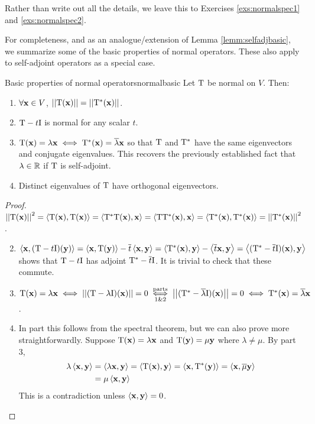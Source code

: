 Rather than write out all the details, we leave this to Exercises \ref{exs:normalspec1} and \ref{exs:normalspec2}.\smallbreak

For completeness, and as an analogue/extension of Lemma \ref{lemm:selfadjbasic}, we summarize some of the basic properties of normal operators. These also apply to self-adjoint operators as a special case.

\begin{lemm}{Basic properties of normal operators}{normalbasic}
	Let $\rT$ be normal on $V$. Then:
	\begin{enumerate}
	  \item $\forall \vx\in V$, $\Nm{\rT(\vx)}=\Nm{\rT^*(\vx)}$.
	  \item $\rT-t\I$ is normal for any scalar $t$.
	  \item $\rT(\vx)=\lambda\vx\iff \rT^*(\vx)=\cl\lambda\vx$ so that $\rT$ and $\rT^*$ have the same eigenvectors and conjugate eigenvalues. This recovers the previously established fact that $\lambda\in\R$ if $\rT$ is self-adjoint.
	  \item Distinct eigenvalues of $\rT$ have orthogonal eigenvectors.
	\end{enumerate}
\end{lemm}


\begin{proof}
	\exstart $\Nm{\rT(\vx)}^2=\ip{\rT(\vx),\rT(\vx)}=\ip{\rT^*\rT(\vx),\vx} =\ip{\rT\rT^*(\vx),\vx}=\ip{\rT^*(\vx),\rT^*(\vx)}=\Nm{\rT^*(\vx)}^2$.
	\begin{enumerate}\setcounter{enumi}{1}
	  \item $\ip{\vx,(\rT-t\I)(\vy)}=\ip{\vx,\rT(\vy)}-\cl t\ip{\vx,\vy} =\ip{\rT^*(\vx),\vy}-\ip{\cl t\vx,\vy} =\ip{(\rT^*-\cl t\I)(\vx),\vy}$ shows that $\rT-t\I$ has adjoint $\rT^*-\cl t\I$. It is trivial to check that these commute.
	  \item $\rT(\vx)=\lambda\vx\iff \Nm{(\rT-\lambda \I)(\vx)}=0\underset{1 \& 2}{\overset{\text{parts}}{\iff}} \Nm{(\rT^*-\cl\lambda \I)(\vx)}=0 \iff \rT^*(\vx)=\cl\lambda\vx$.
	  \item In part this follows from the spectral theorem, but we can also prove more straightforwardly. Suppose $\rT(\vx)=\lambda\vx$ and $\rT(\vy)=\mu\vy$ where $\lambda\neq \mu$. By part 3,
	  \begin{align*}
	  \lambda\ip{\vx,\vy} 
	  	&=\ip{\lambda\vx,\vy} =\ip{\rT(\vx),\vy} =\ip{\vx,\rT^*(\vy)} = \ip{\vx,\cl\mu\vy}\\
	    &=\mu\ip{\vx,\vy}
	  \end{align*}
	  This is a contradiction unless $\ip{\vx,\vy}=0$.\hfill\qedhere
	\end{enumerate}
\end{proof}
\vfil\vfil

